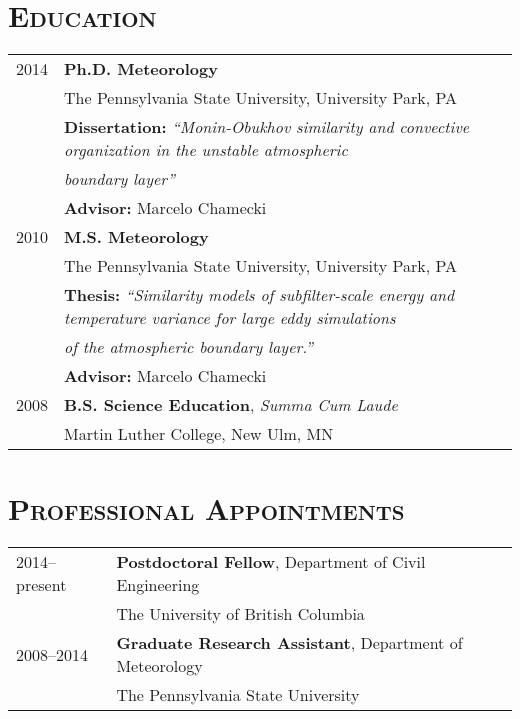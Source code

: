 \documentclass[11pt,letterpaper]{article}
\begin{document}
\section*{\textsc{Education}}
\begin{tabular}{l l}
2014 & \textbf{Ph.D. Meteorology} \\
      & The Pennsylvania State University, University Park, PA \\
      & {\small \textbf{Dissertation:}} \textit{\small``Monin-Obukhov similarity and convective organization in the unstable atmospheric}\\
      & \textit{\small boundary layer''} \\%
      & {\small \textbf{Advisor:}} {\small Marcelo Chamecki} \\[1.5\parskip]

2010 & \textbf{M.S. Meteorology} \\
      & The Pennsylvania State University, University Park, PA \\
      & {\small \textbf{Thesis:}} \textit{\small ``Similarity models of subfilter-scale energy and temperature variance for large eddy simulations} \\
      & \textit{\small of the atmospheric boundary layer.''} \\%
      & {\small \textbf{Advisor:}} {\small Marcelo Chamecki} \\[1.5\parskip]

2008 & \textbf{B.S. Science Education}, \textit{Summa Cum Laude} \\
              & Martin Luther College, New Ulm, MN
\end{tabular}

\section*{\textsc{Professional Appointments}} 

\begin{tabular}{l l}
2014--present & \textbf{Postdoctoral Fellow}, Department of Civil Engineering \\
              & The University of British Columbia \\[1.5\parskip]
2008--2014 & \textbf{Graduate Research Assistant}, Department of Meteorology \\
                 & The Pennsylvania State University
\end{tabular}
\end{document}
